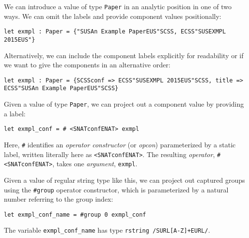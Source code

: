 
We can introduce a value of type \lstinline{Paper} in an analytic position in one of two ways. We can omit the labels and provide component values positionally:
\begin{lstlisting}[numbers=none]
let exmpl : Paper = {"SUSAn Example PaperEUS"SCSS, ECSS"SUSEXMPL 2015EUS"}
\end{lstlisting}
Alternatively, we can include the component labels explicitly for readability or if we want to give the components in an alternative order:
\begin{lstlisting}[numbers=none]
let exmpl : Paper = {SCSSconf => ECSS"SUSEXMPL 2015EUS"SCSS, title => ECSS"SUSAn Example PaperEUS"SCSS}
\end{lstlisting}

Given a value of type \lstinline{Paper}, we can project out a component value by providing  a  label:%
\begin{lstlisting}[numbers=none]
let exmpl_conf = # <SNATconfENAT> exmpl 
\end{lstlisting}
Here, \lstinline{#} identifies an \emph{operator constructor} (or \emph{opcon}) parameterized by a static label, written literally here as \lstinline{<SNATconfENAT>}. The resulting \emph{operator}, \lstinline{# <SNATconfENAT>}, takes one \emph{argument}, \lstinline{exmpl}. 

Given a value of regular string type like this, we can project out captured groups using the \lstinline{#group} operator constructor, which is parameterized by a natural number referring to the group index:
\begin{lstlisting}[numbers=none]
let exmpl_conf_name = #group 0 exmpl_conf
\end{lstlisting}
The variable \lstinline{exmpl_conf_name} has type \lstinline{rstring /SURL[A-Z]+EURL/}.

